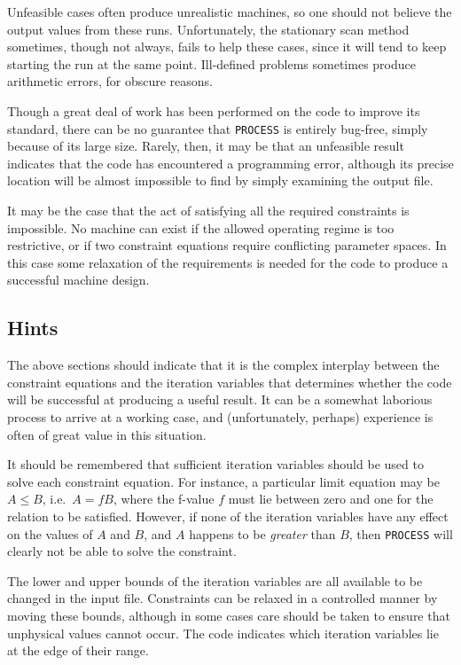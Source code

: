 \documentclass[11pt,a4paper]{report}
\newcommand{\process}{\mbox{\texttt{PROCESS}}}
\begin{document}
Unfeasible cases often produce unrealistic machines, so one should not believe
the output values from these runs. Unfortunately, the stationary scan method
sometimes, though not always, fails to help these cases, since it will tend to
keep starting the run at the same point. Ill-defined problems sometimes
produce arithmetic errors, for obscure reasons.

Though a great deal of work has been performed on the code to improve its
standard, there can be no guarantee that \process\/ is entirely bug-free,
simply because of its large size. Rarely, then, it may be that an unfeasible
result indicates that the code has encountered a programming error, although
its precise location will be almost impossible to find by simply examining the
output file.

It may be the case that the act of satisfying all the required constraints is
impossible. No machine can exist if the allowed operating regime is too
restrictive, or if two constraint equations require conflicting parameter
spaces. In this case some relaxation of the requirements is needed for the
code to produce a successful machine design.

\subsection{Hints}

The above sections should indicate that it is the complex interplay between
the constraint equations and the iteration variables that determines whether
the code will be successful at producing a useful result. It can be a somewhat
laborious process to arrive at a working case, and (unfortunately, perhaps)
experience is often of great value in this situation.

It should be remembered that sufficient iteration variables should be used to
solve each constraint equation. For instance, a particular limit equation may
be $A \leq B$, i.e.\ $A = fB$, where the f-value $f$ must lie between zero and
one for the relation to be satisfied.  However, if none of the iteration
variables have any effect on the values of $A$ and $B$, and $A$ happens to be
\textit{greater}\/ than $B$, then \process\/ will clearly not be able to solve
the constraint.

The lower and upper bounds of the iteration variables are all available to be
changed in the input file. Constraints can be relaxed in a controlled manner
by moving these bounds, although in some cases care should be taken to ensure
that unphysical values cannot occur.  The code indicates which iteration
variables lie at the edge of their range.
\end{document}
